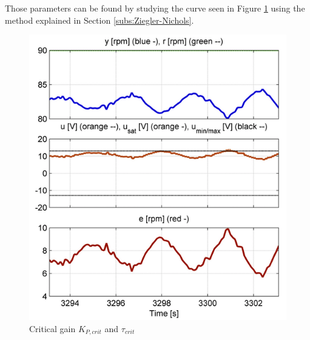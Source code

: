 Those parameters can be found by studying the curve seen in Figure \ref{fig:osc_experiment} using the method explained in Section \ref{subs:Ziegler-Nichols}.

\begin{figure}[H]
\begin{center}
\includegraphics[width=0.6\linewidth]{images/general/Oscillation_Experiment}
\end{center}
\caption{Critical gain $K_{P,crit}$ and $\tau_{crit} $}
\label{fig:osc_experiment}
\end{figure}